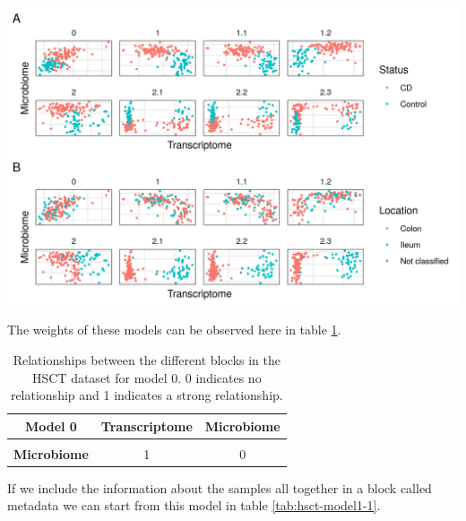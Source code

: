 \documentclass[
  12pt,
  a4paper,
  twoside,
  openright]{book}
\let\origfigure\figure
\let\endorigfigure\endfigure
\renewenvironment{figure}[1][2] {
    \expandafter\origfigure\expandafter[!htbp]
} {
    \endorigfigure
}
\begin{document}
\begin{figure}
\includegraphics[width=1\linewidth]{images/hsct-models} \caption[Models in the HSCT dataset.]{Models in the HSCT dataset. On the abscissa the transcriptome, on the ordinate the Microbiome. Each square represents a different model of the HSCT dataset. On panel A colored by disease status, on panel B colored by sample location. Model 0 has only transcriptome and microbiome data, models 1 to 1.2 with data about the samples and models 2.1 to 2.3 with data about the samples split in 3 blocks.}\label{fig:hsct-models}
\end{figure}

The weights of these models can be observed here in table \ref{tab:hsct-model0}.

\begin{table}[H]

\caption[Model 0 of the HSCT dataset.]{\label{tab:hsct-model0}Relationships between the different blocks in the HSCT dataset for model 0. 0 indicates no relationship and 1 indicates a strong relationship.}
\centering
\begin{tabular}[t]{>{}c|c|c}
\hline
\textbf{Model 0} & \textbf{Transcriptome} & \textbf{Microbiome}\\
\hline
\textbf{\cellcolor{gray!6}{Transcriptome}} & \cellcolor{gray!6}{0} & \cellcolor{gray!6}{1}\\
\hline
\textbf{Microbiome} & 1 & 0\\
\hline
\end{tabular}
\end{table}

If we include the information about the samples all together in a block called metadata we can start from this model in table \ref{tab:hsct-model1-1}.
\end{document}

